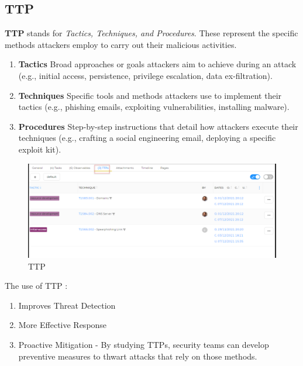 \documentclass{book}
\begin{document}
\subsection{TTP}
\textbf{TTP} stands for \textit{Tactics, Techniques, and Procedures}. These represent the specific methods attackers employ to carry out their malicious activities.

\begin{enumerate}
    \item \textbf{Tactics} Broad approaches or goals attackers aim to achieve during an attack (e.g., initial access, persistence, privilege escalation, data ex-filtration).

    \item \textbf{Techniques} Specific tools and methods attackers use to implement their tactics (e.g., phishing emails, exploiting vulnerabilities, installing malware).

    \item \textbf{Procedures} Step-by-step instructions that detail how attackers execute their techniques (e.g., crafting a social engineering email, deploying a specific exploit kit).
\end{enumerate}
\bigskip
\bigskip
\begin{figure}[h]
    \centering
    \includegraphics[width=.8\linewidth]{Case_images/TTP.png}
    \caption{TTP}
    \label{fig:ttp}
\end{figure}
\bigskip
\bigskip
The use of TTP :
\begin{enumerate}
    \item Improves Threat Detection
    \item More Effective Response
    \item Proactive Mitigation - By studying TTPs, security teams can develop preventive measures to thwart attacks that rely on those methods. 
\end{enumerate}

\newpage
\end{document}
